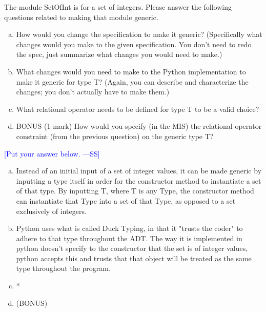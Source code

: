 \documentclass[12pt,fleqn]{examtst}
\newcommand{\authornote}[3]{\textcolor{#1}{[#3 ---#2]}}
\newcommand{\authornote}[3]{}
\newcommand{\wss}[1]{\authornote{blue}{SS}{#1}}
\begin{document}
\newpage

\noindent
\begin{minipage}{\textwidth}

The module SetOfInt is for a set of integers.  Please answer the following
questions related to making that module generic. 
\begin{enumerate}[a.]
\item How would you change the specification to make it generic?  (Specifically
  what changes would you make to the given specification.  You don't need to
  redo the spec, just summarize what changes you would need to make.)
\item What changes would you need to make to the Python
implementation to make it generic for type T?  (Again, you can describe and
characterize the changes; you don't actually have to make them.)
\item What relational operator needs to be defined for type T to be a valid
  choice?
\item BONUS (1 mark) How would you specify (in the MIS) the relational operator
  constraint (from the previous question) on the generic type T?
\end{enumerate}

\wss{Put your answer below.}

\begin{enumerate}[a.]
\item Instead of an initial input of a set of integer values, it can be made generic by inputting a type itself in order for the constructor method to instantiate a set of that type. By inputting T, where T is any Type, the constructor method can instantiate that Type into a set of that Type, as opposed to a set exclusively of integers.
\item Python uses what is called Duck Typing, in that it "trusts the coder" to adhere to that type throughout the ADT. The way it is implemented in python doesn't specify to the constructor that the set is of integer values, python accepts this and trusts that that object will be treated as the same type throughout the program. 
\item *
\item (BONUS)
\end{enumerate}

\end{minipage}
\end{document}
